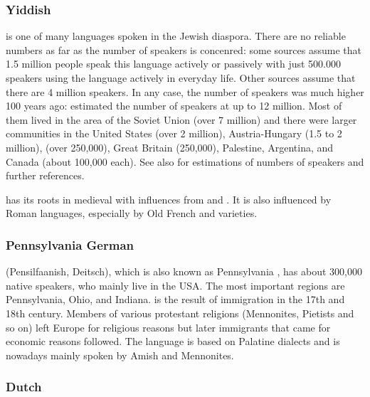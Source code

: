 \subsubsection{Yiddish}

 is one of many languages spoken in the Jewish diaspora. There are no reliable numbers
as far as the number of speakers is concenred: some sources assume that
1.5 million people speak this language actively or passively with just 500.000 speakers using the language
actively in everyday life. Other sources assume that there are 4 million
speakers. In any case, the number of  speakers was much
higher 100 years ago: \citet[]{Birnbaum1915a-u} estimated the number of speakers at up to 12 million. Most of
them lived in the area of the Soviet Union (over 7 million) and there were larger communities in the United States (over 2 million), Austria-Hungary
(1.5 to 2 million),  (over 250,000), Great Britain
(250,000), Palestine, Argentina, and Canada (about 100,000 each). See also  for
estimations of numbers of speakers and further references.

 has its roots
in medieval  with influences from  and . It is also influenced by
Roman languages, especially by Old French and  varieties.


\subsubsection{Pennsylvania German}

 (Pensilfaanish, Deitsch), which is also known as Pennsylvania , has about 300,000
native speakers, who mainly live in the USA. The most important regions are Pennsylvania, Ohio, and
Indiana.  is the result of immigration in the 17th and 18th century. Members of
various protestant religions (Mennonites, Pietists and so on) left Europe for religious reasons  
but later immigrants that came for economic reasons followed.  The language is
based on Palatine dialects and is nowadays mainly spoken by Amish and Mennonites.




\subsubsection{Dutch}

